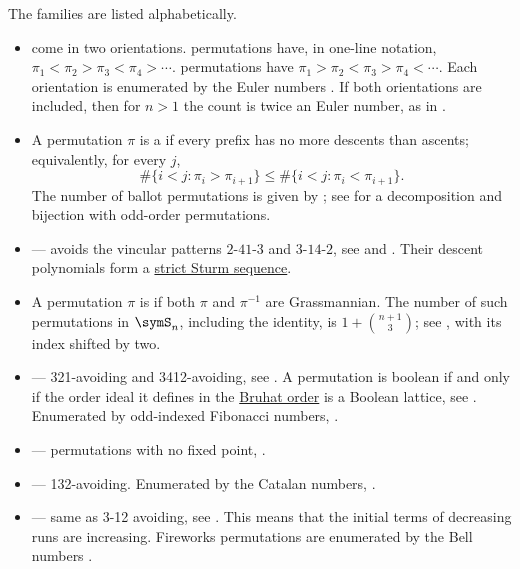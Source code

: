 The families are listed alphabetically.

\begin{itemize}

\item {}\label{permUpDown} come in two
orientations.   permutations have, in one-line
notation, $\pi_1 \lt \pi_2 \gt \pi_3 \lt \pi_4 \gt \dotsb$.
 permutations have
$\pi_1 \gt \pi_2 \lt \pi_3 \gt \pi_4 \lt \dotsb$.
Each orientation is enumerated by the Euler numbers .
If both orientations are included, then for $n\gt 1$ the count is twice an
Euler number, as in .

\item A permutation $\pi$ is a  if every prefix has
no more descents than ascents; equivalently, for every $j$,
\[
  \#\{i<j:\pi_i>\pi_{i+1}\}
  \leq
  \#\{i<j:\pi_i<\pi_{i+1}\}.
\]
The number of ballot permutations is given by ; see
\cite{LinWangZhao2022Ballot} for a decomposition and bijection with odd-order
permutations.

\item {} --- avoids the vincular patterns $2\text{-}41\text{-}3$
and $3\text{-}14\text{-}2$, see \cite{DulucqGuibert1998} and
.  Their descent polynomials form a
\hyperref[baxterHoggattSturm]{strict Sturm sequence}.

\item A permutation $\pi$ is  if both $\pi$ and
$\pi^{-1}$ are Grassmannian.  The number of such permutations in $\symS_n$,
including the identity, is $1+\binom{n+1}{3}$; see , with its
index shifted by two.

\item {} --- 321-avoiding and 3412-avoiding, see
\cite{Tenner2007,GunawanPanRussellTenner2022x}.
A permutation is boolean if and only if the order ideal it defines in the
\hyperref[bruhatOrder]{Bruhat order} is a Boolean lattice,
see \cite[Thm.~4.3]{Tenner2007}.
Enumerated by odd-indexed Fibonacci numbers, .

\item {} --- permutations with no fixed point, .

\item {} --- 132-avoiding.
Enumerated by the Catalan numbers, .

\item {} --- same as 3-12 avoiding, see
\cite{ChouSetiabrata2025x}. This means that the initial terms of decreasing
runs are increasing.  Fireworks permutations are enumerated by the Bell
numbers .


\end{itemize}
